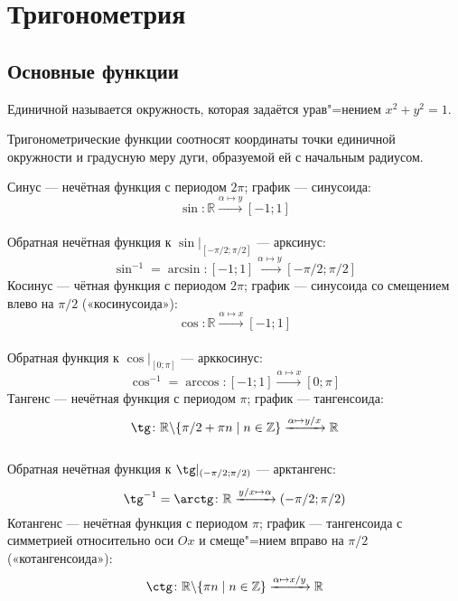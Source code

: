 \section{Тригонометрия}

\subsection{Основные функции}

{\bold Единичной} называется окружность, которая задаётся урав"=нением $x^2+y^2=1$.\par

Тригонометрические функции соотносят {\ital координаты} точки единичной окружности
и {\ital градусную меру дуги}, образуемой ей с начальным радиусом.\par

{\bold Синус} --- нечётная функция с периодом $2\pi$; график --- {\ital синусоида}:
\\[-13pt]
$$\sin\colon\mathbb{R}\xrightarrow{\alpha\mapsto y}[-1;1]$$\\[-1pt]

Обратная нечётная функция к $\sin\vert_{[-\pi/2;\pi/2]}$ --- {\bold арксинус}:
$$\sin^{-1}=\arcsin\colon[-1;1]\xrightarrow{\alpha\mapsto y}[-\pi/2;\pi/2]$$
{\bold Косинус} --- чётная функция с периодом $2\pi$; график --- {\ital синусоида}
со смещением влево на $\pi/2$ {\ital\color{desc} («косинусоида»)}:\\[-6pt]
$$\cos\colon\mathbb{R}\xrightarrow{\alpha\mapsto x}[-1;1]$$\\[-1pt]

Обратная функция к $\cos\vert_{[0;\pi]}$ --- {\bold арккосинус}:
$$\cos^{-1}=\arccos\colon[-1;1]\xrightarrow{\alpha\mapsto x}[0;\pi]$$
{\bold Тангенс} --- нечётная функция с периодом $\pi$; график --- {\ital тангенсоида}:
\\[-13pt]
$$\tg\colon\mathbb{R}\backslash\{\pi/2+\pi n\mid n\in\mathbb{Z}\}\xrightarrow
{\alpha\mapsto y/x}\mathbb{R}$$\\[-1pt]

Обратная нечётная функция к $\tg\vert_{(-\pi/2;\pi/2)}$ --- {\bold арктангенс}:
$$\tg^{-1}=\arctg\colon\mathbb{R}\xrightarrow{y/x\mapsto\alpha}(-\pi/2;\pi/2)$$
{\bold Котангенс} --- нечётная функция с периодом $\pi$; график --- {\ital тангенсоида}
с симметрией относительно оси $Ox$ и смеще"=нием вправо на $\pi/2$ {\ital\color{desc} 
(«котангенсоида»)}:\\[-7pt]
$$\ctg\colon\mathbb{R}\backslash\{\pi n\mid n\in\mathbb{Z}\}\xrightarrow{\alpha\mapsto
x/y}\mathbb{R}$$\\[-1pt]

